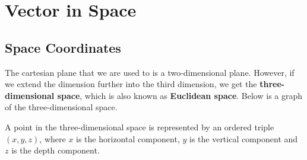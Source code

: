 \chapter{Vector in Space}

\section*{Space Coordinates}

The cartesian plane that we are used to is a two-dimensional plane. However, if
we extend the dimension further into the third dimension, we get the
\textbf{three-dimensional space}, which is also known as \textbf{Euclidean
    space}. Below is a graph of the three-dimensional space.
\begin{center}
\end{center}
A point in the three-dimensional space is represented by an ordered triple $(x, y, z)$, where $x$ is the horizontal component, $y$ is the vertical component and $z$ is the depth component.

